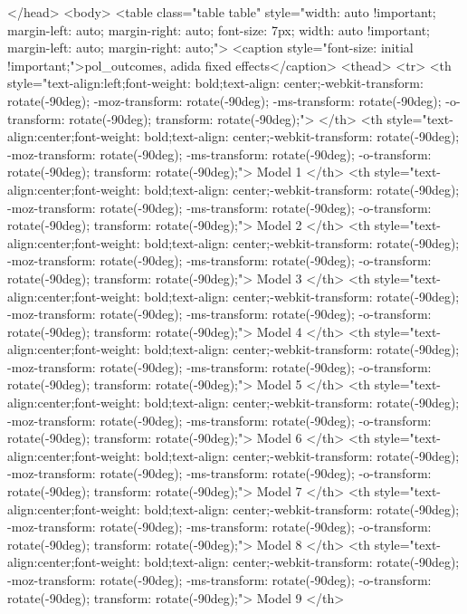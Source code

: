</head>
<body>
<table class="table table" style="width: auto !important; margin-left: auto; margin-right: auto; font-size: 7px; width: auto !important; margin-left: auto; margin-right: auto;">
<caption style="font-size: initial !important;">pol_outcomes, adida fixed effects</caption>
 <thead>
  <tr>
   <th style="text-align:left;font-weight: bold;text-align: center;-webkit-transform: rotate(-90deg); -moz-transform: rotate(-90deg); -ms-transform: rotate(-90deg); -o-transform: rotate(-90deg); transform: rotate(-90deg);">   </th>
   <th style="text-align:center;font-weight: bold;text-align: center;-webkit-transform: rotate(-90deg); -moz-transform: rotate(-90deg); -ms-transform: rotate(-90deg); -o-transform: rotate(-90deg); transform: rotate(-90deg);"> Model 1 </th>
   <th style="text-align:center;font-weight: bold;text-align: center;-webkit-transform: rotate(-90deg); -moz-transform: rotate(-90deg); -ms-transform: rotate(-90deg); -o-transform: rotate(-90deg); transform: rotate(-90deg);"> Model 2 </th>
   <th style="text-align:center;font-weight: bold;text-align: center;-webkit-transform: rotate(-90deg); -moz-transform: rotate(-90deg); -ms-transform: rotate(-90deg); -o-transform: rotate(-90deg); transform: rotate(-90deg);"> Model 3 </th>
   <th style="text-align:center;font-weight: bold;text-align: center;-webkit-transform: rotate(-90deg); -moz-transform: rotate(-90deg); -ms-transform: rotate(-90deg); -o-transform: rotate(-90deg); transform: rotate(-90deg);"> Model 4 </th>
   <th style="text-align:center;font-weight: bold;text-align: center;-webkit-transform: rotate(-90deg); -moz-transform: rotate(-90deg); -ms-transform: rotate(-90deg); -o-transform: rotate(-90deg); transform: rotate(-90deg);"> Model 5 </th>
   <th style="text-align:center;font-weight: bold;text-align: center;-webkit-transform: rotate(-90deg); -moz-transform: rotate(-90deg); -ms-transform: rotate(-90deg); -o-transform: rotate(-90deg); transform: rotate(-90deg);"> Model 6 </th>
   <th style="text-align:center;font-weight: bold;text-align: center;-webkit-transform: rotate(-90deg); -moz-transform: rotate(-90deg); -ms-transform: rotate(-90deg); -o-transform: rotate(-90deg); transform: rotate(-90deg);"> Model 7 </th>
   <th style="text-align:center;font-weight: bold;text-align: center;-webkit-transform: rotate(-90deg); -moz-transform: rotate(-90deg); -ms-transform: rotate(-90deg); -o-transform: rotate(-90deg); transform: rotate(-90deg);"> Model 8 </th>
   <th style="text-align:center;font-weight: bold;text-align: center;-webkit-transform: rotate(-90deg); -moz-transform: rotate(-90deg); -ms-transform: rotate(-90deg); -o-transform: rotate(-90deg); transform: rotate(-90deg);"> Model 9 </th>
